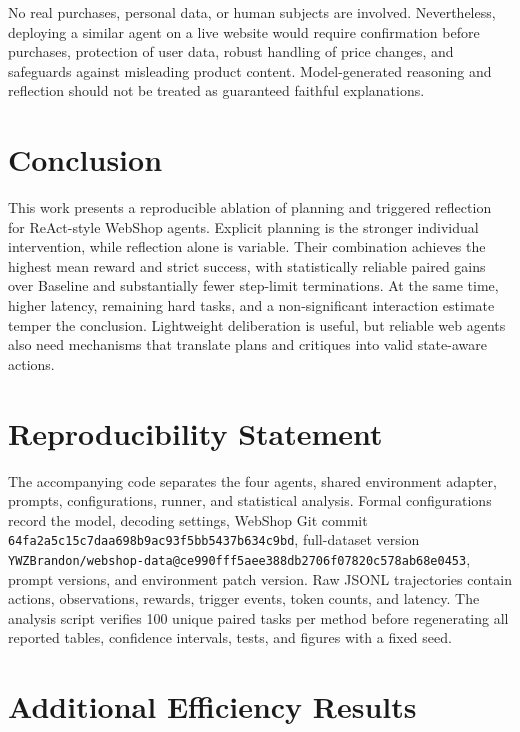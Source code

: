 \documentclass{article}
\begin{document}
No real purchases, personal data, or human subjects are involved. Nevertheless, deploying a similar agent on a live website would require confirmation before purchases, protection of user data, robust handling of price changes, and safeguards against misleading product content. Model-generated reasoning and reflection should not be treated as guaranteed faithful explanations.

\section{Conclusion}

This work presents a reproducible ablation of planning and triggered reflection for ReAct-style WebShop agents. Explicit planning is the stronger individual intervention, while reflection alone is variable. Their combination achieves the highest mean reward and strict success, with statistically reliable paired gains over Baseline and substantially fewer step-limit terminations. At the same time, higher latency, remaining hard tasks, and a non-significant interaction estimate temper the conclusion. Lightweight deliberation is useful, but reliable web agents also need mechanisms that translate plans and critiques into valid state-aware actions.

\section*{Reproducibility Statement}

The accompanying code separates the four agents, shared environment adapter, prompts, configurations, runner, and statistical analysis. Formal configurations record the model, decoding settings, WebShop Git commit \texttt{64fa2a5c15c7daa698b9ac93f5bb5437b634c9bd}, full-dataset version \texttt{YWZBrandon/webshop-data@ce990fff5aee388db2706f07820c578ab68e0453}, prompt versions, and environment patch version. Raw JSONL trajectories contain actions, observations, rewards, trigger events, token counts, and latency. The analysis script verifies 100 unique paired tasks per method before regenerating all reported tables, confidence intervals, tests, and figures with a fixed seed.




\appendix

\section{Additional Efficiency Results}
\end{document}
